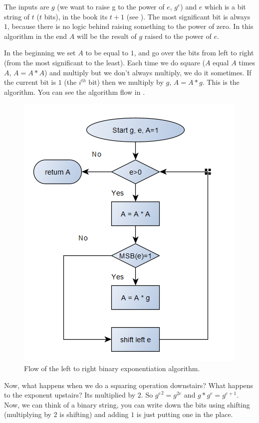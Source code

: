 The inputs are $g$ (we want to raise g to the power of $e$, \(g^e\)) and \(e\)
which is a bit string of $t$ ($t$ bits), in the book its $t+1$ (see
). The most significant bit is always $1$, because there is no
logic behind raising something to the power of zero. In this algorithm in the
end \(A\) will be the result of $g$ raised to the power of $e$. 

In the beginning we set $A$ to be equal to $1$, and go over the bits from left
to right (from the most significant to the least). Each time we do square ($A$
equal $A$ times $A$, $A=A*A$) and multiply but we don't always multiply, we do
it sometimes. If the current bit is $1$ (the \( i^{th}\) bit) then we multiply
by $g$, $A=A*g$. This is the algorithm. You can see the algorithm flow in .

\begin{figure}[!ht]
    \centering
    \includegraphics[scale=0.8]{images/chapter_3/left-to-right-binary-exponentiation-flow.png}
    \caption{Flow of the left to right binary exponentiation algorithm.} \label{fig:ltrbe-flow}
\end{figure}

Now, what happens when we do a squaring
operation downstairs? What happens to the exponent upstairs? Its multiplied by
$2$. So \({g^{e}}^2 = g^{2e} \)  and  \(g*g^{e} = g^{e+1} \). Now, we can think
of a binary string, you can write down the bits using shifting (multiplying by
$2$ is shifting) and adding $1$ is just putting one in the place.


